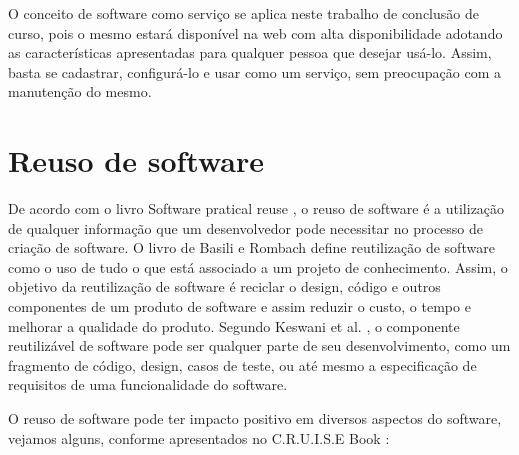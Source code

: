 O conceito de software como serviço se aplica neste trabalho de conclusão de curso, pois o mesmo estará disponível na web com alta disponibilidade adotando as características apresentadas para qualquer pessoa que desejar usá-lo. Assim, basta se cadastrar, configurá-lo e usar como um serviço, sem preocupação com a manutenção do mesmo.


\section{Reuso de software}\label{sec:reuso} %


De acordo com o livro Software pratical reuse \citep{Ezran2002}, o reuso de software é a utilização de qualquer informação que um desenvolvedor pode necessitar no processo de criação de software. O livro de Basili e Rombach \citep{Basili1991} define reutilização de software como o uso de tudo o que está associado a um projeto de conhecimento.
Assim, o objetivo da reutilização de software é reciclar o design, código e outros componentes de um produto de software e assim reduzir o custo, o tempo e melhorar a qualidade do produto.
Segundo Keswani et al. \cite{6783445}, o componente reutilizável de software pode ser qualquer parte de seu desenvolvimento, como um fragmento de código, design, casos de teste, ou até mesmo a especificação de requisitos de uma funcionalidade do software. 

O reuso de software pode ter impacto positivo em diversos aspectos do software, vejamos alguns, conforme apresentados no C.R.U.I.S.E Book \citep{cruise2007} :

